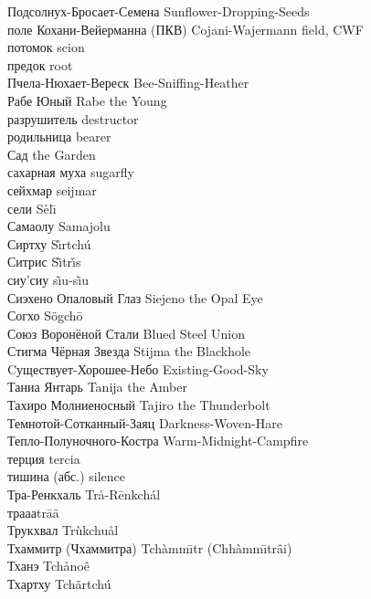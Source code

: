 \documentclass[a4paper,10pt]{book}
\newcommand{\ldotst}{\so{...}\xspace}
\begin{document}
Подсолнух-Бросает-Семена \hfill Sunflower-Dropping-Seeds\\
поле Кохани-Вейерманна (ПКВ) \hfill Cojani-Wajermann field, CWF\\
потомок \hfill scion\\
предок \hfill root\\
Пчела-Нюхает-Вереск \hfill Bee-Sniffing-Heather\\
Рабе Юный \hfill Rabe the Young\\
разрушитель \hfill destructor\\
родильница \hfill bearer\\
Сад \hfill the Garden\\
сахарная муха \hfill sugarfly\\
сейхмар \hfill seijmar\\
сели \hfill S\r{e}l\={\i}\\
Самаолу \hfill Samajolu\\
Сиртху \hfill S\r{\i}rtch\'{u}\\
Ситрис \hfill S\~{\i}tr\v{\i}s\\
сиу'сиу \hfill s\~{\i}u-s\~{\i}u\\
Сиэхено Опаловый Глаз \hfill Siejeno the Opal Eye\\
Согхо \hfill S\"{o}gch\={o}\\
Союз Воронёной Стали \hfill Blued Steel Union\\
Стигма Чёрная Звезда \hfill Stijma the Blackhole\\
Cуществует-Хорошее-Небо \hfill Existing-Good-Sky\\
Таниа Янтарь \hfill Tanija the Amber\\
Тахиро Молниеносный \hfill Tajiro the Thunderbolt\\
Темнотой-Сотканный-Заяц \hfill Darkness-Woven-Hare\\
Тепло-Полуночного-Костра \hfill Warm-Midnight-Campfire\\
терция \hfill tercia\\
тишина (абс.) \hfill silence\\
Тра-Ренкхаль \hfill Tr\r{a}-R\={e}nkch\'{a}l\\
трааа\ldotst \hfill tr\={a}\"{a}\ldotst \\
Трукхвал \hfill Tr\`{u}kchu\r{a}l\\
Тхаммитр (Чхаммитра) \hfill Tch\`{a}mm\={\i}tr (Chh\`{a}mm\={\i}tr\^{a}i)\\
Тханэ \hfill Tch\r{a}no\^{e}\\
Тхартху \hfill Tch\~{a}rtch\'{u}\\
\end{document}
